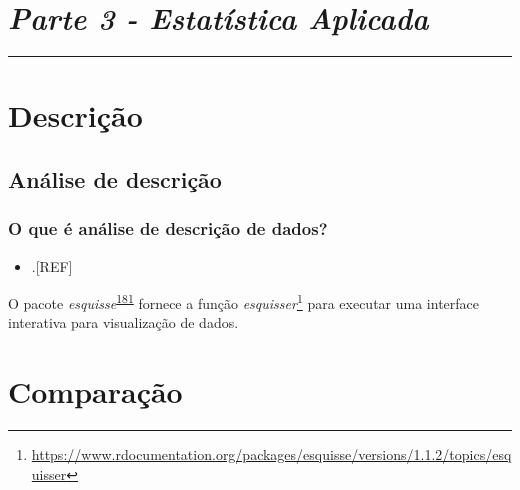 \documentclass[
  a4paper,
]{book}
\providecommand{\tightlist}{%
  \setlength{\itemsep}{0pt}\setlength{\parskip}{0pt}}
\renewcommand{\href}[2]{#2\footnote{\url{#1}}}
\newenvironment{infobox}[1]
  {
  \begin{itemize}
  \renewcommand{\labelitemi}{
    \raisebox{-.7\height}[0pt][0pt]{
      {\setkeys{Gin}{width=3em,keepaspectratio}
        \texttt{[image: \#1]}}
    }
  }
  \setlength{\fboxsep}{1em}
  \begin{blackbox}
  \item
  }
  {
  \end{blackbox}
  \end{itemize}
  }
\begin{document}

\hypertarget{parte-3---estatuxedstica-aplicada}{%
\chapter*{\texorpdfstring{\emph{Parte 3 - Estatística Aplicada}}{Parte 3 - Estatística Aplicada}}\label{parte-3---estatuxedstica-aplicada}}

\markboth{}{}
\par\noindent\rule{\textwidth}{0.05in}

\hypertarget{analise-descricao}{%
\chapter{\texorpdfstring{\textbf{Descrição}}{Descrição}}\label{analise-descricao}}

\hypertarget{analise-descricao}{%
\section{Análise de descrição}\label{analise-descricao}}

\hypertarget{o-que-uxe9-anuxe1lise-de-descriuxe7uxe3o-de-dados}{%
\subsection{O que é análise de descrição de dados?}\label{o-que-uxe9-anuxe1lise-de-descriuxe7uxe3o-de-dados}}

\begin{itemize}
\tightlist
\item
  .{[}REF{]}
\end{itemize}

\begin{infobox}{images/Rlogo}
O pacote \emph{esquisse}\textsuperscript{\protect\hyperlink{ref-esquisse}{181}} fornece a função \href{https://www.rdocumentation.org/packages/esquisse/versions/1.1.2/topics/esquisser}{\emph{esquisser}} para executar uma interface interativa para visualização de dados.

\end{infobox}

\hypertarget{analise-comparacao}{%
\chapter{\texorpdfstring{\textbf{Comparação}}{Comparação}}\label{analise-comparacao}}
\end{document}
